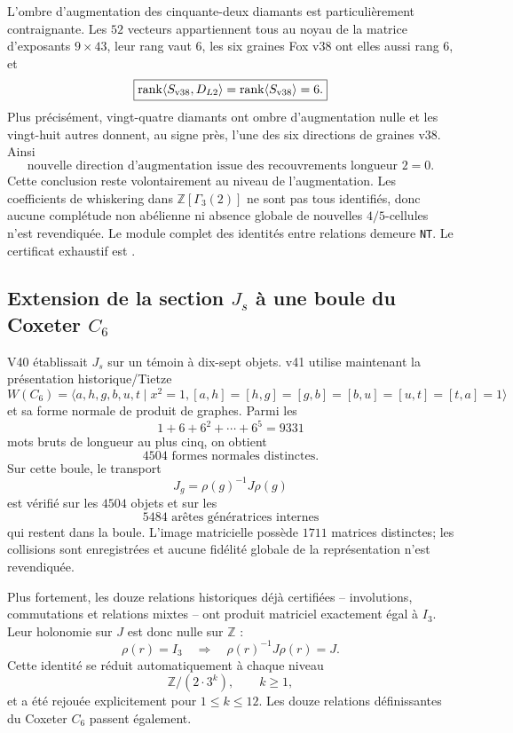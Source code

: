 \documentclass[11pt,a4paper]{article}
\newcommand{\certNT}{\texttt{NT}}
\begin{document}
L'ombre d'augmentation des cinquante-deux diamants est particulièrement contraignante. Les $52$ vecteurs appartiennent tous au noyau de la matrice d'exposants $9\times43$, leur rang vaut $6$, les six graines Fox v38 ont elles aussi rang $6$, et
\[
 \boxed{
 \operatorname{rank}\langle S_{\rm v38},D_{L2}\rangle
 =\operatorname{rank}\langle S_{\rm v38}\rangle
 =6.}
\]
Plus précisément, vingt-quatre diamants ont ombre d'augmentation nulle et les vingt-huit autres donnent, au signe près, l'une des six directions de graines v38. Ainsi
\[
 \boxed{
 \text{nouvelle direction d'augmentation issue des recouvrements longueur }2=0.}
\]
Cette conclusion reste volontairement au niveau de l'augmentation. Les coefficients de whiskering dans $\mathbb Z[\Gamma_3(2)]$ ne sont pas tous identifiés, donc aucune complétude non abélienne ni absence globale de nouvelles $4/5$-cellules n'est revendiquée. Le module complet des identités entre relations demeure \certNT. Le certificat exhaustif est .

\subsection{Extension de la section $J_s$ à une boule du Coxeter $C_6$}

V40 établissait $J_s$ sur un témoin à dix-sept objets. v41 utilise maintenant la présentation historique/Tietze
\[
 W(C_6)=\langle a,h,g,b,u,t\mid x^2=1,
 [a,h]=[h,g]=[g,b]=[b,u]=[u,t]=[t,a]=1\rangle
\]
et sa forme normale de produit de graphes. Parmi les
\[
 1+6+6^2+\cdots+6^5=9331
\]
mots bruts de longueur au plus cinq, on obtient
\[
 \boxed{4504\text{ formes normales distinctes}.}
\]
Sur cette boule, le transport
\[
 J_g=\rho(g)^{-1}J\rho(g)
\]
est vérifié sur les $4504$ objets et sur les
\[
 \boxed{5484\text{ arêtes génératrices internes}}
\]
qui restent dans la boule. L'image matricielle possède $1711$ matrices distinctes; les collisions sont enregistrées et aucune fidélité globale de la représentation n'est revendiquée.

Plus fortement, les douze relations historiques déjà certifiées -- involutions, commutations et relations mixtes -- ont produit matriciel exactement égal à $I_3$. Leur holonomie sur $J$ est donc nulle sur $\mathbb Z$ :
\[
 \rho(r)=I_3
 \quad\Longrightarrow\quad
 \rho(r)^{-1}J\rho(r)=J.
\]
Cette identité se réduit automatiquement à chaque niveau
\[
 \mathbb Z/(2\cdot3^k),
 \qquad k\ge1,
\]
et a été rejouée explicitement pour $1\le k\le12$. Les douze relations définissantes du Coxeter $C_6$ passent également.
\end{document}
